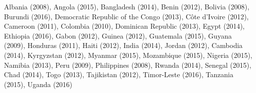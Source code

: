 Albania (2008), Angola (2015), Bangladesh (2014), Benin (2012), Bolivia (2008), Burundi (2016), Democratic Republic of the Congo (2013), Côte d'Ivoire (2012), Cameroon (2011), Colombia (2010), Dominican Republic (2013), Egypt (2014), Ethiopia (2016), Gabon (2012), Guinea (2012), Guatemala (2015), Guyana (2009), Honduras (2011), Haiti (2012), India (2014), Jordan (2012), Cambodia (2014), Kyrgyzstan (2012), Myanmar (2015), Mozambique (2015), Nigeria (2015), Namibia (2013), Peru (2009), Philippines (2008), Rwanda (2014), Senegal (2015), Chad (2014), Togo (2013), Tajikistan (2012), Timor-Leste (2016), Tanzania (2015), Uganda (2016)